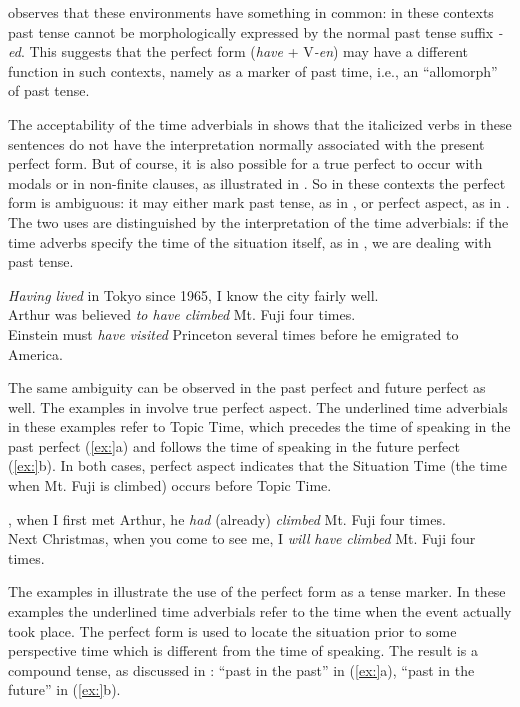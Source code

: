 \citet[101]{McCawley1971} observes that these environments have something in common: in these contexts past tense cannot be morphologically expressed by the normal past tense suffix \textit{-ed}. This suggests that the perfect form (\textit{have} + V\textit{-en}) may have a different function in such contexts, namely as a marker of past time, i.e., an “allomorph” of past tense.



The acceptability of the time adverbials in  shows that the italicized verbs in these sentences do not have the interpretation normally associated with the present perfect form. But of course, it is also possible for a true perfect to occur with modals or in non-finite clauses, as illustrated in . So in these contexts the perfect form is ambiguous: it may either mark past tense, as in , or perfect aspect, as in . The two uses are distinguished by the interpretation of the time adverbials: if the time adverbs specify the time of the situation itself, as in , we are dealing with past tense.


\ea
\ea \textit{Having lived} in Tokyo since 1965, I know the city fairly well.\\
\ex Arthur was believed \textit{to have climbed} Mt. Fuji four times.\\
\ex Einstein must \textit{have visited} Princeton several times before he emigrated to America.
                       \z
\z


The same ambiguity can be observed in the past perfect and future perfect as well. The examples in  involve true perfect aspect. The underlined time adverbials in these examples refer to Topic Time, which precedes the time of speaking in the past perfect (\ref{ex:}a) and follows the time of speaking in the future perfect (\ref{ex:}b). In both cases, perfect aspect indicates that the Situation Time (the time when Mt. Fuji is climbed) occurs before Topic Time.


\ea
{}, when I first met Arthur, he \textit{had} (already) \textit{climbed} Mt. Fuji four times.\\
\ex Next Christmas, when you come to see me, I \textit{will} \textit{have} \textit{climbed} Mt. Fuji four times.
                       \z
\z


The examples in  illustrate the use of the perfect form as a tense marker. In these examples the underlined time adverbials refer to the time when the event actually took place. The perfect form is used to locate the situation prior to some perspective time which is different from the time of speaking. The result is a compound tense, as discussed in : “past in the past” in (\ref{ex:}a), “past in the future” in (\ref{ex:}b).


